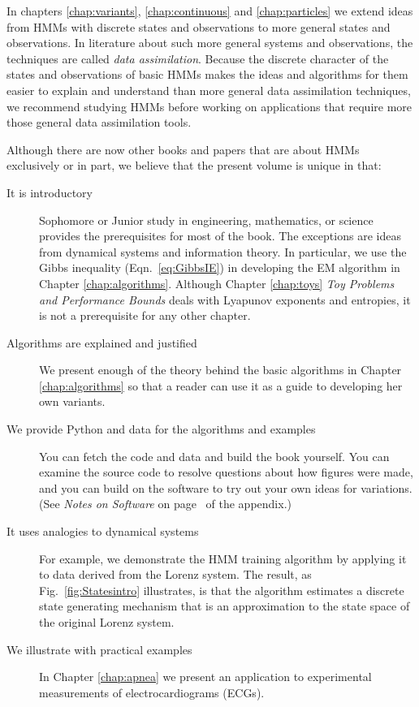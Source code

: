 \documentclass[ltxbook,showlabels, commentsvisible]{hmmdsbook}
\begin{document}
In chapters \ref{chap:variants}, \ref{chap:continuous} and
\ref{chap:particles} we extend ideas from HMMs with discrete states
and observations to more general states and observations.  In
literature about such more general systems and observations, the
techniques are called \emph{data assimilation}.  Because the discrete
character of the states and observations of basic HMMs makes the ideas
and algorithms for them easier to explain and understand than more
general data assimilation techniques, we recommend studying HMMs
before working on applications that require more those general data
assimilation tools.

Although there are now other books and papers that are about HMMs
exclusively or in part, we believe that the present volume is unique in
that:
\begin{description}
\item[It is introductory] Sophomore or Junior study in engineering,
  mathematics, or science provides the prerequisites for most of the
  book.  The exceptions are ideas from dynamical systems and
  information theory.  In particular, we use the Gibbs inequality
  (Eqn.~\eqref{eq:GibbsIE}) in developing the EM algorithm in Chapter
  \ref{chap:algorithms}.  Although Chapter \ref{chap:toys} \emph{Toy
    Problems and Performance Bounds} deals with Lyapunov exponents and
  entropies, it is not a prerequisite for any other chapter.
\item[Algorithms are explained and justified] We present enough of the
  theory behind the basic algorithms in Chapter \ref{chap:algorithms}
  so that a reader can use it as a guide to developing her own
  variants.
\item[We provide Python and data for the algorithms and examples] You
  can fetch the code and data and build the book yourself.  You can
  examine the source code to resolve questions about how figures were
  made, and you can build on the software to try out your own ideas
  for variations.  (See \emph{Notes on Software} on
  page~\pageref{cha:Software} of the appendix.)
\item[It uses analogies to dynamical systems] For example, we
  demonstrate the HMM training algorithm by applying it to data
  derived from the Lorenz system.  The result, as
  Fig.~\ref{fig:Statesintro} illustrates, is that the algorithm
  estimates a discrete state generating mechanism that is an
  approximation to the state space of the original Lorenz system.
\item[We illustrate with practical examples] In Chapter
  \ref{chap:apnea} we present an application to experimental
  measurements of electrocardiograms (ECGs).  
\end{description}
\end{document}
